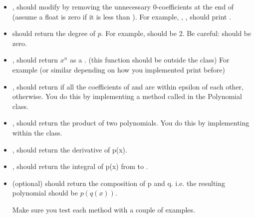 \documentclass[letterpaper,11pt]{amsart}
\theoremstyle{plain}
\theoremstyle{definition}
\begin{document}
\begin{itemize}
  \item {}, should modify  by removing the unnecessary 0-coefficients at the end of  (assume a float is zero if it is less than ). For example, , ,  should print . 
  \item {} should return the degree of $p$. For example,  should be 2. Be careful:  should be zero.
  \item {}, should return $x^n$ as a . (this function should be outside the class) For example  (or similar depending on how you implemented print before)
  \item {}, should return  if all the coefficients of  and  are within epsilon of each other,  otherwise. You do this by implementing a method called  in the Polynomial class. 
  \item {}, should return the product of two polynomials. You do this by implementing  within the class.
  \item {}, should return the derivative of p(x).  
  \item {}, should return the integral of p(x) from  to .  
  \item (optional)  should return the composition of p and q. i.e. the resulting polynomial should be $p(q(x))$.

Make sure you test each method with a couple of examples. 
\end{itemize}
\end{document}
